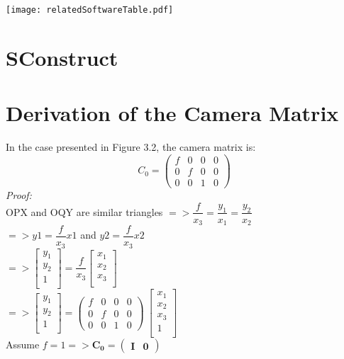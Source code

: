 \documentclass[12pt,a4paper,twoside,openright]{report}
\begin{document}
\texttt{[image: relatedSoftwareTable.pdf]}


\chapter{SConstruct}


\chapter{Derivation of the Camera Matrix}
In the case presented in Figure 3.2, the camera matrix is:
\[ C_{0}=\left(\begin{array}{cccc}
f & 0 & 0 & 0 \\
0 & f & 0 & 0 \\
0 & 0 & 1 & 0\end{array} \right)\]
\linebreak
\emph{Proof:} \\
OPX and OQY are similar triangles
$=> \dfrac{f}{x_{3}} = \dfrac{y_{1}}{x_{1}} = \dfrac{y_{2}}{x_{2}}$\\
\vspace{20pt}
$=> y1 = \dfrac{f}{x_{3}}x1$  and   $y2 = \dfrac{f}{x_{3}}x2$ \\
\vspace{20pt}
$=> \begin{bmatrix}
         y_{1} \\
         y_{2} \\
         1\\
        \end{bmatrix} = \dfrac{f}{x_{3}} \begin{bmatrix}
         x_{1} \\
         x_{2} \\
         x_{3}\\
        \end{bmatrix}$ \\
        \vspace{20pt}
$=> \begin{bmatrix}
         y_{1} \\
         y_{2} \\
         1\\
        \end{bmatrix} = \left(\begin{array}{cccc}
f & 0 & 0 & 0 \\
0 & f & 0 & 0 \\
0 & 0 & 1 & 0\end{array} \right)\ \begin{bmatrix}
         x_{1} \\
         x_{2} \\
         x_{3}\\
         1\\
        \end{bmatrix}$\\
     \linebreak
Assume $f = 1 => \mathbf{C_{0}} = \left ( \begin{array} {c|c} \mathbf{I} & \mathbf{0} \end{array} \right )$ \\ 
\linebreak
\end{document}
